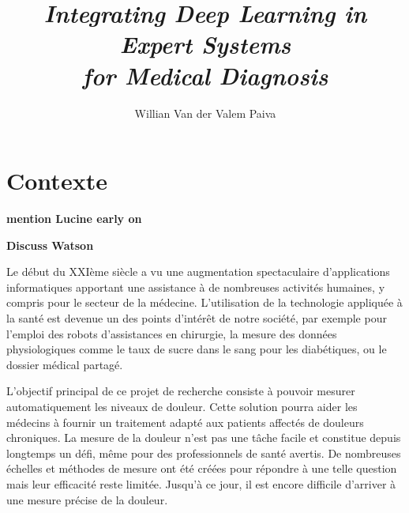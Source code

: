\documentclass[11pt]{article}
\date{}
\title{\emph{Integrating Deep Learning in Expert Systems\\ for Medical Diagnosis}}
\author{Willian Van der Valem Paiva}
\begin{document}
\maketitle

\newcommand{\vincent}[1]{{\color{ForestGreen}#1}}
\newcommand{\vincentrmk}[1]{{\color{ForestGreen}\bf #1}}


\section{Contexte}
\label{sec:orgf816e45}

\vincentrmk{mention Lucine early on}

\vincentrmk{Discuss Watson}

Le début  du XXIème  siècle a vu  une augmentation  spectaculaire d’applications
informatiques apportant  une assistance  à de  nombreuses activités  humaines, y
compris  pour  le  secteur  de  la médecine.  L’utilisation  de  la  technologie
appliquée à la santé  est devenue un des points d’intérêt  de notre société, par
exemple  pour l’emploi  des robots  d'assistances  en chirurgie,  la mesure  des
données physiologiques comme le taux de sucre dans le sang pour les diabétiques,
ou le dossier médical partagé.



L’objectif  principal de  ce  projet  de recherche  consiste  à pouvoir  mesurer
automatiquement  les  niveaux  de  douleur.  Cette
solution   pourra  aider  les médecins  à fournir  un  traitement adapté  aux
patients affectés de douleurs chroniques. La  mesure de la douleur n’est pas une
tâche facile et constitue depuis longtemps un défi, même pour des professionnels
de santé  avertis. De nombreuses échelles  et méthodes de mesure  ont été créées
pour             répondre à            une             telle             question
\cite{wong1996wong,mccaffery1999pain,portenoy1996visual,melzack1975mcgill,galer1997development,gracely1988descriptor}
mais leur  efficacité reste limitée.  Jusqu’à  ce jour, il est  encore difficile
d’arriver à une mesure précise de la douleur.
\end{document}
